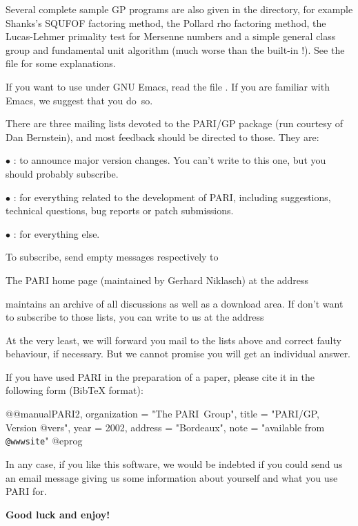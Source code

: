  Several complete sample GP programs are also given in
the  directory, for example Shanks's SQUFOF factoring method,
the Pollard rho factoring method, the Lucas-Lehmer primality test for
Mersenne numbers and a simple general class group and fundamental unit
algorithm (much worse than the built-in !). See the file
 for some explanations.

 If you want to use  under GNU Emacs, read the file
. If you are familiar with Emacs, we suggest that
you do~so.

 There are three mailing lists devoted to the
PARI/GP package (run courtesy of Dan Bernstein), and most feedback should be
directed to those. They are:

$\bullet$ : to announce major version changes.
You can't write to this one, but you should probably subscribe.

$\bullet$ : for everything related to the development
of PARI, including suggestions, technical questions, bug reports or patch
submissions.

 $\bullet$ : for everything else.

\noindent To subscribe, send empty messages respectively to

\centerline{}

\centerline{}

\centerline{}

\noindent The PARI home page (maintained by Gerhard Niklasch) at the address

\centerline{\wwwsite}

\noindent maintains an archive of all discussions as well as a download area.
If don't want to subscribe to those lists, you can write to us at the address

\centerline{}

\noindent At the very least, we will forward you mail to the lists above and
correct faulty behaviour, if necessary. But we cannot promise you will get an
individual answer.

If you have used PARI in the preparation of a paper, please cite it in the
following form (BibTeX format):

\def\@{@}
\bprog
@@manual{PARI2,
    organization = "{The PARI~Group}",
    title        = "{PARI/GP, Version @vers}",
    year         = 2002,
    address      = "Bordeaux",
    note         = "available from {\tt @wwwsite}"
}
@eprog
\smallskip

\noindent In any case, if you like this software, we would be indebted if you
could send us an email message giving us some information about yourself and
what you use PARI for.

\medskip
{\bf Good luck and enjoy!}
\vfill\eject
